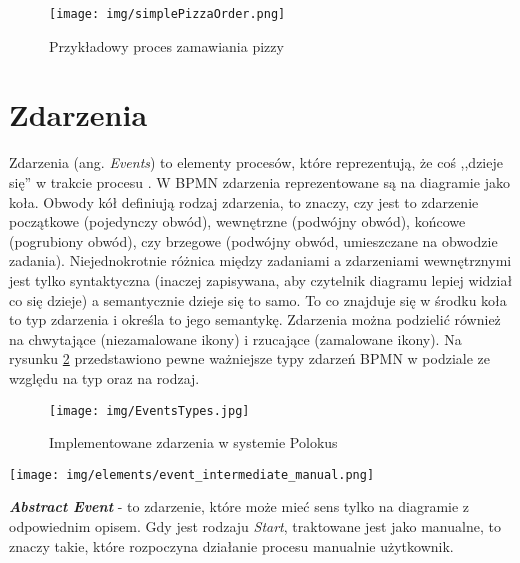 \documentclass[declaration,shortabstract,mgr]{iithesis}
\newcommand{\bpmn}{BPMN }
\begin{document}
\begin{figure}[H]
    \texttt{[image: img/simplePizzaOrder.png]}
    \caption{Przykładowy proces zamawiania pizzy}
    \label{fig:tasks-example}
\end{figure}


\section{Zdarzenia}

Zdarzenia (ang. \textit{Events}) to elementy procesów, które reprezentują, że coś ,,dzieje się'' w trakcie procesu \cite{bruce-silver-bpmn-events}. W \bpmn zdarzenia reprezentowane są na diagramie jako koła. Obwody kół definiują rodzaj zdarzenia, to znaczy, czy jest to zdarzenie początkowe (pojedynczy obwód), wewnętrzne (podwójny obwód), końcowe (pogrubiony obwód), czy brzegowe (podwójny obwód, umieszczane na obwodzie zadania). Niejednokrotnie różnica między zadaniami a zdarzeniami wewnętrznymi jest tylko syntaktyczna (inaczej zapisywana, aby czytelnik diagramu lepiej widział co się dzieje) a semantycznie dzieje się to samo. To co znajduje się w środku koła to typ zdarzenia i określa to jego semantykę. Zdarzenia można podzielić również na chwytające (niezamalowane ikony) i rzucające (zamalowane ikony). Na rysunku \ref{fig:event-types} przedstawiono pewne ważniejsze typy zdarzeń \bpmn w podziale ze względu na typ oraz na rodzaj.

\begin{figure}
    \texttt{[image: img/EventsTypes.jpg]}
    \caption{Implementowane zdarzenia w systemie Polokus}
    \label{fig:event-types}
\end{figure}

\noindent\begin{minipage}[t]{0.075\textwidth}\vspace{0pt}
\texttt{[image: img/elements/event\_intermediate\_manual.png]}
\end{minipage}\hfill
\begin{minipage}[t]{0.875\textwidth}\vspace{0pt}
\textbf{\textit{Abstract Event}} - to zdarzenie, które może mieć sens tylko na diagramie z odpowiednim opisem. Gdy jest rodzaju \textit{Start}, traktowane jest jako manualne, to znaczy takie, które rozpoczyna działanie procesu manualnie użytkownik.
\end{minipage}

\vspace{\mypointsep}
\end{document}
